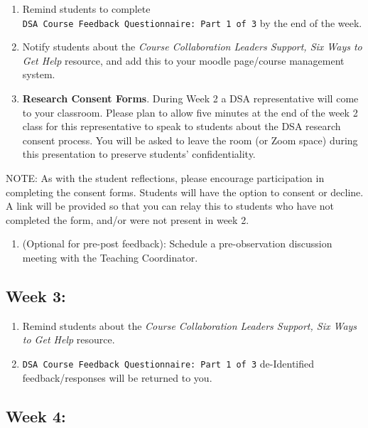\documentclass[
]{book}
\providecommand{\tightlist}{%
  \setlength{\itemsep}{0pt}\setlength{\parskip}{0pt}}
\begin{document}
\begin{enumerate}
\def\labelenumi{\arabic{enumi})}
\item
  Remind students to complete \texttt{DSA\ Course\ Feedback\ Questionnaire:\ Part\ 1\ of\ 3} by the end of the week.
\item
  Notify students about the \emph{Course Collaboration Leaders Support, Six Ways to Get Help} resource, and add this to your moodle page/course management system.
\item
  \textbf{Research Consent Forms}. During Week 2 a DSA representative will come to your classroom. Please plan to allow five minutes at the end of the week 2 class for this representative to speak to students about the DSA research consent process. You will be asked to leave the room (or Zoom space) during this presentation to preserve students' confidentiality.
\end{enumerate}

NOTE: As with the student reflections, please encourage participation in completing the consent forms. Students will have the option to consent or decline. A link will be provided so that you can relay this to students who have not completed the form, and/or were not present in week 2.

\begin{enumerate}
\def\labelenumi{\arabic{enumi})}
\setcounter{enumi}{3}
\tightlist
\item
  (Optional for pre-post feedback): Schedule a pre-observation discussion meeting with the Teaching Coordinator.
\end{enumerate}

\hypertarget{week-3}{%
\subsection{Week 3:}\label{week-3}}

\begin{enumerate}
\def\labelenumi{\arabic{enumi})}
\item
  Remind students about the \emph{Course Collaboration Leaders Support, Six Ways to Get Help} resource.
\item
  \texttt{DSA\ Course\ Feedback\ Questionnaire:\ Part\ 1\ of\ 3} de-Identified feedback/responses will be returned to you.
\end{enumerate}

\hypertarget{week-4}{%
\subsection{Week 4:}\label{week-4}}
\end{document}
